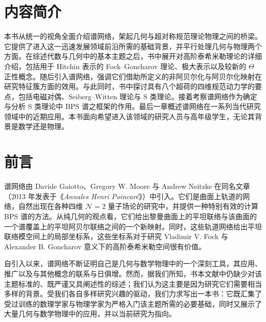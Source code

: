 
\chapter*{内容简介}

本书从统一的视角全面介绍谱网络，架起几何与超对称规范理论物理之间的桥梁。它提供了进入这一迅速发展领域前沿所需的基础背景，并平行处理几何与物理两个方面。在综述代数与几何中的基本主题之后，书中展开对高阶泰希米勒理论的详细介绍，包括用于 Hitchin 表示的 Fock–Goncharov 理论、极大表示以及较新的 $\Theta$ 正性概念。随后引入谱网络，强调它们借助所定义的非阿贝尔化与阿贝尔化映射在研究特征簇方面的效用。与此同时，书中探讨具有八个超荷的四维规范动力学的要点，包括电磁对偶、Seiberg–Witten 理论与 S 类理论。接着考察谱网络作为确定与分析 S 类理论中 BPS 谱之框架的作用。最后一章概述谱网络在一系列当代研究领域中的近期应用。本书面向希望进入该领域的研究人员与高年级学生，无论其背景是数学还是物理。


\chapter*{前言}

谱网络由 Davide Gaiotto、Gregory W. Moore 与 Andrew Neitzke 在同名文章（2013 年发表于《\textit{Annales Henri Poincaré}》）中引入。它们是曲面上轨道的网络，自然出现在各种四维 $\mathcal N=2$ 量子场论的研究中，并提供一种特别有效的计算 BPS 谱的方法。从纯几何的观点看，它们给出黎曼曲面上的平坦联络与该曲面的一个谱覆盖上的平坦阿贝尔联络之间的一个新映射。同时，这些轨道网络给出平坦联络模空间上的局部坐标系，这些坐标系对于研究 Vladimir V. Fock 与 Alexander B. Goncharov 意义下的高阶泰希米勒空间很有价值。

自引入以来，谱网络不断证明自己是几何与数学物理中的一个深刻工具，其应用、推广以及与其他概念的联系与日俱增。然而，据我们所知，书本文献中仍缺少对该主题标准的、既严谨又具阐述性的综述；我们认为这主要是因为研究它们需要相当多样的背景。受我们各自多样研究兴趣的驱动，我们力求写出一本书：它既汇集了受过训练的数理学家与物理学家为严格入门该主题所需的必要基础，同时又展示了大量几何与数学物理中的应用，并以当前研究为指向。

